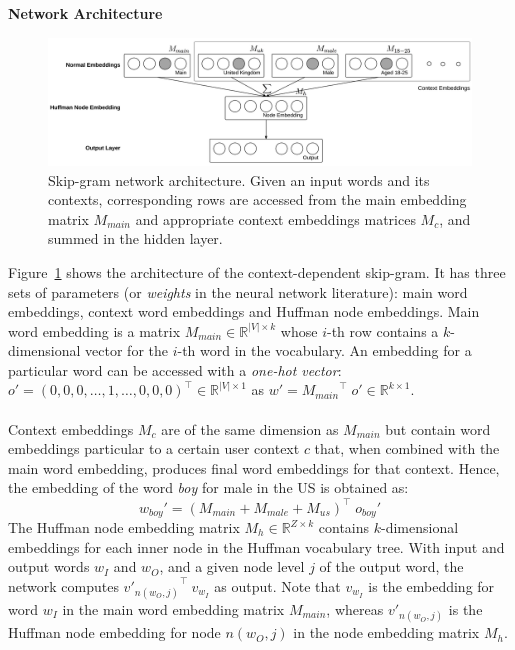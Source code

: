 \documentclass[a4paper,12pt,twoside,openright]{report}
\newcommand{\refs}[1]{}
\newcommand{\tb}{\vspace{10pt} \textbf}
\newcommand{\ti}{\textit}
\newcommand{\nl}{\\ \\}
\begin{document}
\tb{Network Architecture}

\begin{figure}[htbp]
    \hspace{-2.7cm}
    \includegraphics[width=20cm]{figs/chap4/architecture.png}
    \captionsetup{justification=centering}
    \caption[Skip-gram network architecture. ]{Skip-gram network architecture. Given an input words and its contexts, corresponding rows are accessed from the main embedding matrix $M_{main}$ and appropriate context embeddings matrices $M_c$, and summed in the hidden layer.}
    \label{fig:chap4:skipgram}
\end{figure}

Figure~\ref{fig:chap4:skipgram} shows the architecture of the context-dependent skip-gram. It has three sets of parameters (or \ti{weights} in the neural network literature): main word embeddings, context word embeddings and Huffman node embeddings. Main word embedding is a matrix $M_{main} \in \mathbb{R}^{|V|\times k}$ whose $i$-th row contains a $k$-dimensional vector for the $i$-th word in the vocabulary. An embedding for a particular word can be accessed with a \ti{one-hot vector}: $o'=(0,0,0,\dots,1,\dots,0,0,0)^{\intercal} \in \mathbb{R}^{|V|\times 1}$ as $w'={M_{main}}^{\intercal}\;o'\in \mathbb{R}^{k\times 1}.$
\nl
Context embeddings $M_{c}$ are of the same dimension as $M_{main}$ but contain word embeddings particular to a certain user context $c$ that, when combined with the main word embedding, produces final word embeddings for that context. Hence, the embedding of the word \ti{boy} for male in the US is obtained as:
$$w_{boy}'=(M_{main}+M_{male}+M_{us})^{\intercal}\;o_{boy}'$$
The Huffman node embedding matrix $M_{h} \in \mathbb{R}^{Z\times k}$ contains $k$-dimensional embeddings for each inner node in the Huffman vocabulary tree. With input and output words $w_I$ and $w_O$, and a given node level $j$ of the output word, the network computes ${v'_{n(w_O,j)}}^{\intercal}\:v_{w_I}$ as output. Note that $v_{w_I}$ is the embedding for word $w_I$ in the main word embedding matrix $M_{main}$, whereas $v'_{n(w_O,j)}$ is the Huffman node embedding for node $n(w_O,j)$ in the node embedding matrix $M_{h}$.
\refs{HOW MANY CONTEXTS HAVE BEEN CREATED}
\end{document}
